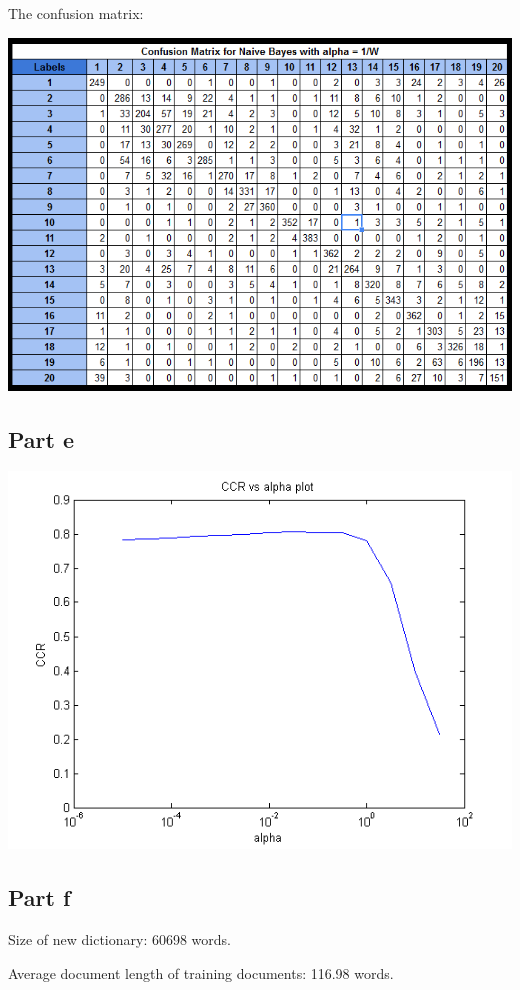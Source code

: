 \documentclass[paper=a4, fontsize=11pt]{scrartcl} %
\numberwithin{equation}{section} %
\numberwithin{figure}{section} %
\numberwithin{table}{section} %
\begin{document}
	The confusion matrix:
	
	\includegraphics[scale=0.9]{2d_confusion_matrix}
	
	\subsection{Part e}
	
	\includegraphics{2e_log_graph}
	
	\subsection{Part f}
	Size of new dictionary: 60698 words.
	
	Average document length of training documents: 116.98 words.
	
\end{document}
